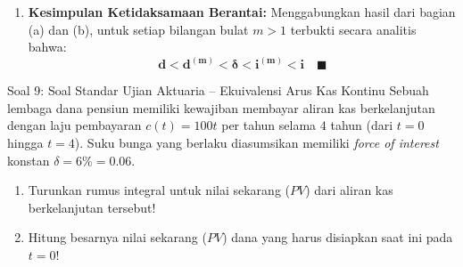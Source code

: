 \documentclass[11pt,a4paper]{article}
\begin{document}
\begin{solutionbox}[Soal 8]
\begin{enumerate}[label=(\alph*)]
    \item \textbf{Kesimpulan Ketidaksamaan Berantai:}
    Menggabungkan hasil dari bagian (a) dan (b), untuk setiap bilangan bulat $m > 1$ terbukti secara analitis bahwa:
    \begin{equation*}
        \mathbf{d < d^{(m)} < \delta < i^{(m)} < i} \quad \blacksquare
    \end{equation*}
\end{enumerate}
\end{solutionbox}

\vspace{1.2em}

\begin{problembox}{Soal 9: Soal Standar Ujian Aktuaria -- Ekuivalensi Arus Kas Kontinu}
Sebuah lembaga dana pensiun memiliki kewajiban membayar aliran kas berkelanjutan dengan laju pembayaran $c(t) = 100t$ per tahun selama $4$ tahun (dari $t = 0$ hingga $t = 4$). Suku bunga yang berlaku diasumsikan memiliki \textit{force of interest} konstan $\delta = 6\% = 0.06$.
\begin{enumerate}[label=(\alph*)]
    \item Turunkan rumus integral untuk nilai sekarang ($PV$) dari aliran kas berkelanjutan tersebut!
    \item Hitung besarnya nilai sekarang ($PV$) dana yang harus disiapkan saat ini pada $t = 0$!
\end{enumerate}
\end{problembox}
\end{document}
